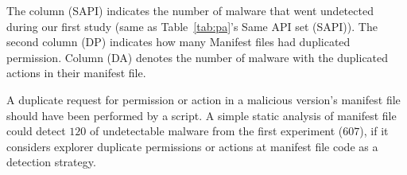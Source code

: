 The column (SAPI) indicates the number of malware that went undetected during our first study (same as Table~\ref{tab:pa}'s Same API set (SAPI)). The second column (DP) indicates how many Manifest files had duplicated permission. Column (DA) denotes the number of malware with the duplicated actions in their manifest file.

A duplicate request for permission or action in a malicious version's manifest file should have been performed by a script. A simple static analysis of manifest file could detect $120$ of undetectable malware from the first experiment ($607$), if it considers explorer duplicate permissions or actions at manifest file code as a detection strategy.

